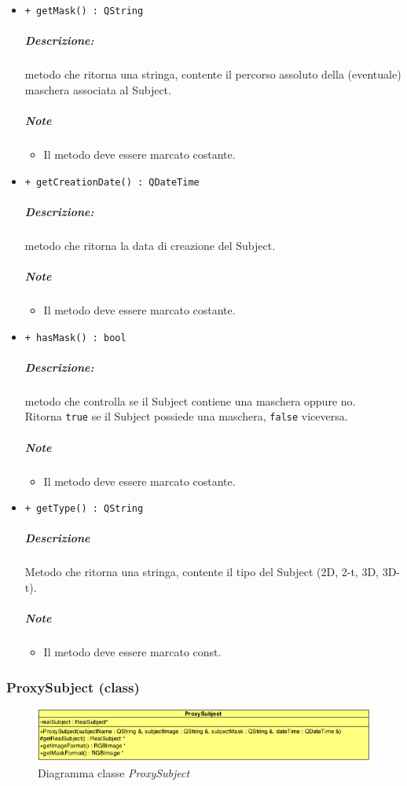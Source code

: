 \begin{itemize}
			\item \color{blue} \verb!+ getMask() : QString! 
			\color{black}
			\subparagraph{Descrizione:} metodo che ritorna una stringa, contente il percorso assoluto della (eventuale) maschera associata al Subject\g{}.
			\subparagraph{Note}
			\begin{itemize}
				\item Il metodo deve essere marcato costante.
			\end{itemize}
			
			\item \color{blue} \verb!+ getCreationDate() : QDateTime!
			\color{black}
			\subparagraph{Descrizione:} metodo che ritorna la data di creazione del Subject\g{}.
			\subparagraph{Note}
			\begin{itemize}
				\item Il metodo deve essere marcato costante.
			\end{itemize}
			
			\item \color{blue} \verb!+ hasMask() : bool!
			\color{black}
			\subparagraph{Descrizione:} metodo che controlla se il Subject\g{} contiene una maschera\g{} oppure no.
			\\Ritorna \verb!true! se il Subject\g{} possiede una maschera, \verb!false! viceversa.
			\subparagraph{Note}
			\begin{itemize}
				\item Il metodo deve essere marcato costante.
			\end{itemize}
			
			\item \color{blue} \verb!+ getType() : QString!
			\color{black}
			\subparagraph{Descrizione} Metodo che ritorna una stringa, contente il tipo del Subject\g{} (2D, 2-t, 3D, 3D-t).
			\subparagraph{Note}
			\begin{itemize}
				\item Il metodo deve essere marcato const.
			\end{itemize}
		\end{itemize}


\pagebreak
\color{black}
\subsubsection{ProxySubject (class)}
\label{proxySubject}
\begin{figure}[!h]
\centering
			\includegraphics[width=1\linewidth]{./Content/Immagini/modelCore/ProxySubject.png}
			\caption{Diagramma classe \textsl{ProxySubject}}
			\label{proxySubject_img}
\end{figure}

